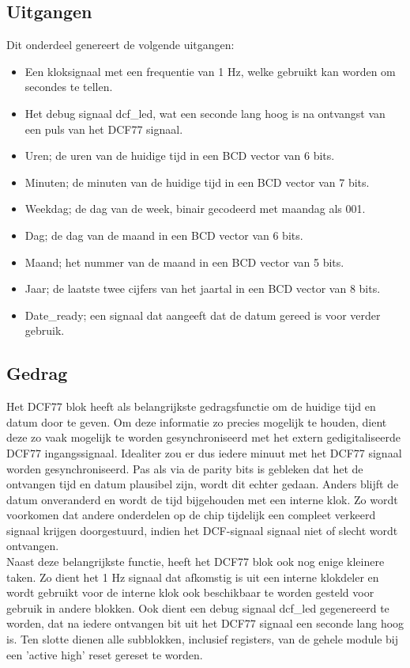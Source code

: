 \subsection{Uitgangen}
Dit onderdeel genereert de volgende uitgangen:
\begin{itemize}[nolistsep]
\item Een kloksignaal met een frequentie van 1 Hz, welke gebruikt kan worden om secondes te tellen.
\item Het debug signaal dcf\_led, wat een seconde lang hoog is na ontvangst van een puls van het DCF77 signaal.
\item Uren; de uren van de huidige tijd in een BCD vector van 6 bits.
\item Minuten; de minuten van de huidige tijd in een BCD vector van 7 bits.
\item Weekdag; de dag van de week, binair gecodeerd met maandag als 001.
\item Dag; de dag van de maand in een BCD vector van 6 bits.
\item Maand; het nummer van de maand in een BCD vector van 5 bits.
\item Jaar; de laatste twee cijfers van het jaartal in een BCD vector van 8 bits.
\item Date\_ready; een signaal dat aangeeft dat de datum gereed is voor verder gebruik.
\end{itemize}

\subsection{Gedrag}
Het DCF77 blok heeft als belangrijkste gedragsfunctie om de huidige tijd en datum door te geven. Om deze informatie zo precies mogelijk te houden, dient deze zo vaak mogelijk te worden gesynchroniseerd met het extern gedigitaliseerde DCF77 ingangssignaal. Idealiter zou er dus iedere minuut met het DCF77 signaal worden gesynchroniseerd. Pas als via de parity bits is gebleken dat het de ontvangen tijd en datum plausibel zijn, wordt dit echter gedaan. Anders blijft de datum onveranderd en wordt de tijd bijgehouden met een interne klok. Zo wordt voorkomen dat andere onderdelen op de chip tijdelijk een compleet verkeerd signaal krijgen doorgestuurd, indien het DCF-signaal signaal niet of slecht wordt ontvangen.\\

\noindent Naast deze belangrijkste functie, heeft het DCF77 blok ook nog enige kleinere taken. Zo dient het 1 Hz signaal dat afkomstig is uit een interne klokdeler en wordt gebruikt voor de interne klok ook beschikbaar te worden gesteld voor gebruik in andere blokken. Ook dient een debug signaal dcf\_led gegenereerd te worden, dat na iedere ontvangen bit uit het DCF77 signaal een seconde lang hoog is. Ten slotte dienen alle subblokken, inclusief registers, van de gehele module bij een 'active high' reset gereset te worden.

